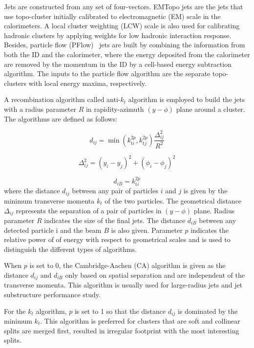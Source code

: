 Jets are constructed from any set of four-vectors. EMTopo jets are the jets that use topo-cluster initially calibrated to electromagnetic (EM) scale in the calorimeters. A local cluster weighting (LCW) scale is also used for calibrating hadronic clusters by applying weights for low hadronic interaction response. Besides, particle flow (PFlow)~\cite{PERF-2015-09} jets are built by combining the information from both the ID and the calorimeter, where the energy deposited from the calorimeter are removed by the momentum in the ID by a cell-based energy subtraction algorithm. The inputs to the particle flow algorithm are the separate topo-clusters with local energy maxima, respectively. 

A recombination algorithm called anti-$k_t$ algorithm is employed to build the jets with a radius parameter $R$ in rapidity-azimuth $(y-\phi)$ plane around a cluster. The algorithms are defined as follows:

\begin{equation}
d_{i j}=\min \left(k_{\mathrm{t} i}^{2 p}, k_{\mathrm{t} j}^{2 p}\right) \frac{\Delta_{i j}^2}{R^2}
\end{equation}

\begin{equation}
\Delta_{i j}^2=\left(y_i-y_j\right)^2+\left(\phi_i-\phi_j\right)^2
\end{equation}

\begin{equation}
d_{i B}=k_{\mathrm{t} i}^{2 p}
\end{equation}
where the distance $d_{i j}$ between any pair of particles $i$ and $j$ is given by the minimum transverse momenta $k_t$ of the two particles. The geometrical distance $\Delta_{i j}$ represents the separation of a pair of particles in $(y-\phi)$ plane. Radius parameter $R$ indicates the size of the final jets. The distance $d_{i B}$ between any detected particle i and the beam $B$ is also given. Parameter $p$ indicates the relative power of of energy with respect to geometrical scales and is used to distinguish the different types of algorithms.

When $p$ is set to 0,  the Cambridge-Aachen (CA) algorithm is given as the distance $d_{i j}$ and $d_{i B}$ only based on spatial separation and are independent of the transverse momenta. This algorithm is usually used for large-radius jets and jet substructure performance study.

For the $k_t$ algorithm, $p$ is set to 1 so that the distance $d_{i j}$ is dominated by the minimum $k_t$. This algorithm is preferred for clusters that are soft and collinear splits are merged first, resulted in irregular footprint with the most interesting splits.

